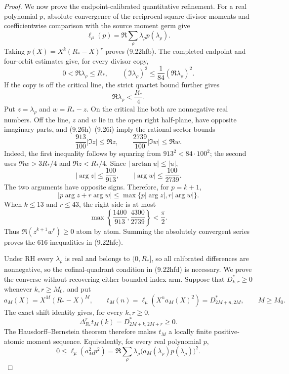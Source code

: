 \documentclass[11pt]{article}
\begin{document}
\begin{proof}
We now prove the endpoint-calibrated quantitative refinement.  For a real polynomial $p$, absolute
convergence of the reciprocal-square divisor moments and coefficientwise comparison with the
source moment germ give
\[
 \ell_\mu(p)=\Re\sum_\rho\lambda_\rho p(\lambda_\rho).
 \tag{9.26g}
\]
Taking $p(X)=X^k(R_*-X)^r$ proves \textup{(9.22hfb)}.  The completed endpoint and
four-orbit estimates give, for every divisor copy,
\[
 0<\Re\lambda_\rho\le R_*,\qquad
 (\Im\lambda_\rho)^2\le\frac1{84}(\Re\lambda_\rho)^2.
 \tag{9.26h}
\]
If the copy is off the critical line, the strict quartet bound further gives
\[
 \Re\lambda_\rho<\frac{R_*}{4}.
 \tag{9.26i}
\]
Put $z=\lambda_\rho$ and $w=R_*-z$.  On the critical line both are nonnegative real numbers.
Off the line, $z$ and $w$ lie in the open right half-plane, have opposite imaginary parts, and
\textup{(9.26h)}--\textup{(9.26i)} imply the rational sector bounds
\[
 \frac{913}{100}|\Im z|\le\Re z,
 \qquad
 \frac{2739}{100}|\Im w|\le\Re w.
 \tag{9.26j}
\]
Indeed, the first inequality follows by squaring from
$913^2<84\cdot100^2$; the second uses
$\Re w>3R_*/4$ and $\Re z<R_*/4$.  Since
$|\arctan u|\le|u|$,
\[
 |\arg z|\le\frac{100}{913},\qquad
 |\arg w|\le\frac{100}{2739}.
 \tag{9.26k}
\]
The two arguments have opposite signs.  Therefore, for $p=k+1$,
\[
 |p\arg z+r\arg w|
 \le\max\{p|\arg z|,r|\arg w|\}.
 \tag{9.26l}
\]
When $k\le13$ and $r\le43$, the right side is at most
\[
 \max\left\{\frac{1400}{913},\frac{4300}{2739}\right\}<\frac\pi2.
 \tag{9.26m}
\]
Thus $\Re(z^{k+1}w^r)\ge0$ atom by atom.  Summing the absolutely convergent series proves the
616 inequalities in \textup{(9.22hfc)}.

Under RH every $\lambda_\rho$ is real and belongs to $(0,R_*]$, so all calibrated differences
are nonnegative, so the cofinal-quadrant condition in \textup{(9.22hfd)} is necessary.  We prove
the converse without recovering either bounded-index arm.  Suppose that
$D^*_{k,r}\ge0$ whenever $k,r\ge M_0$, and put
\[
 a_M(X)=X^M(R_*-X)^M,\qquad
 t_M(n)=\ell_\mu\!\left(X^na_M(X)^2\right)
       =D^*_{2M+n,2M},\qquad M\ge M_0.
 \tag{9.26n}
\]
The exact shift identity gives, for every $k,r\ge0$,
\[
 \Delta_{R_*}^{r}t_M(k)=D^*_{2M+k,2M+r}\ge0.
 \tag{9.26o}
\]
The Hausdorff--Bernstein theorem therefore makes $t_M$ a locally finite positive-atomic moment
sequence.  Equivalently, for every real polynomial $p$,
\[
 0\le\ell_\mu\!\left(a_M^2p^2\right)
   =\Re\sum_\rho\lambda_\rho
      \bigl(a_M(\lambda_\rho)p(\lambda_\rho)\bigr)^2.
 \tag{9.26p}
\]


\end{proof}
\end{document}

